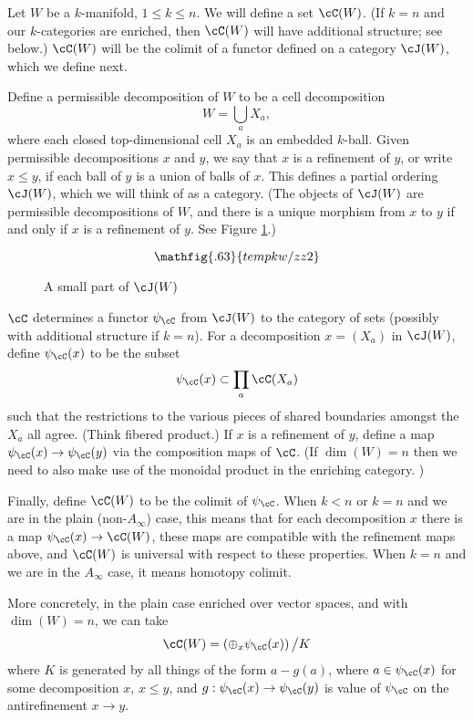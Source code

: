 Let $W$ be a $k$-manifold, $1\le k \le n$.
We will define a set $\cC(W)$.
(If $k = n$ and our $k$-categories are enriched, then
$\cC(W)$ will have additional structure; see below.)
$\cC(W)$ will be the colimit of a functor defined on a category $\cJ(W)$,
which we define next.

Define a permissible decomposition of $W$ to be a cell decomposition
\[
	W = \bigcup_a X_a ,
\]
where each closed top-dimensional cell $X_a$ is an embedded $k$-ball.
Given permissible decompositions $x$ and $y$, we say that $x$ is a refinement
of $y$, or write $x \le y$, if each ball of $y$ is a union of balls of $x$.
This defines a partial ordering $\cJ(W)$, which we will think of as a category.
(The objects of $\cJ(W)$ are permissible decompositions of $W$, and there is a unique
morphism from $x$ to $y$ if and only if $x$ is a refinement of $y$.
See Figure \ref{partofJfig}.)

\begin{figure}[!ht]
\begin{equation*}
\mathfig{.63}{tempkw/zz2}
\end{equation*}
\caption{A small part of $\cJ(W)$}
\label{partofJfig}
\end{figure}


$\cC$ determines 
a functor $\psi_\cC$ from $\cJ(W)$ to the category of sets 
(possibly with additional structure if $k=n$).
For a decomposition $x = (X_a)$ in $\cJ(W)$, define $\psi_\cC(x)$ to be the subset
\[
	\psi_\cC(x) \sub \prod_a \cC(X_a)
\]
such that the restrictions to the various pieces of shared boundaries amongst the
$X_a$ all agree.
(Think fibered product.)
If $x$ is a refinement of $y$, define a map $\psi_\cC(x)\to\psi_\cC(y)$
via the composition maps of $\cC$.
(If $\dim(W) = n$ then we need to also make use of the monoidal
product in the enriching category.
)

Finally, define $\cC(W)$ to be the colimit of $\psi_\cC$.
When $k<n$ or $k=n$ and we are in the plain (non-$A_\infty$) case, this means that
for each decomposition $x$ there is a map
$\psi_\cC(x)\to \cC(W)$, these maps are compatible with the refinement maps
above, and $\cC(W)$ is universal with respect to these properties.
When $k=n$ and we are in the $A_\infty$ case, it means
homotopy colimit.

More concretely, in the plain case enriched over vector spaces, and with $\dim(W) = n$, we can take
\[
	\cC(W) = \left( \oplus_x \psi_\cC(x)\right) \big/ K
\]
where $K$ is generated by all things of the form $a - g(a)$, where
$a\in \psi_\cC(x)$ for some decomposition $x$, $x\le y$, and $g: \psi_\cC(x)
\to \psi_\cC(y)$ is value of $\psi_\cC$ on the antirefinement $x\to y$.

